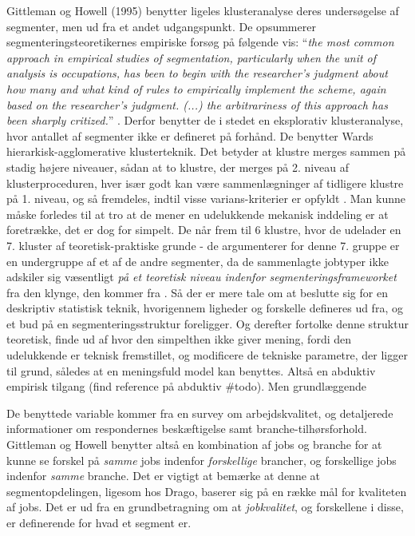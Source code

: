 Gittleman og Howell (1995) benytter ligeles klusteranalyse deres undersøgelse af segmenter, men ud fra et andet udgangspunkt. De opsummerer segmenteringsteoretikernes empiriske forsøg på følgende vis: “\emph{the most common approach in empirical studies of segmentation, particularly when the unit of analysis is occupations, has been to begin with the researcher's judgment about how many and what kind of rules to empirically implement the scheme, again based on the researcher's judgment. (...) the arbitrariness of this approach has been sharply critized.}” \parencite[422]{Gittleman1995}. Derfor benytter de i stedet en eksplorativ klusteranalyse, hvor antallet af segmenter ikke er defineret på forhånd. De benytter Wards hierarkisk-agglomerative klusterteknik. Det betyder at klustre merges sammen på stadig højere niveauer, sådan at to klustre, der merges på 2. niveau af klusterproceduren, hver især godt kan være sammenlægninger af tidligere klustre på 1. niveau, og så fremdeles, indtil visse varians-kriterier er opfyldt \parencite[425]{Gittleman1995}.
Man kunne måske forledes til at tro at de mener en udelukkende mekanisk inddeling er at foretrække, det er dog for simpelt. De når frem til 6 klustre, hvor de udelader en 7. kluster af teoretisk-praktiske grunde - de argumenterer for denne 7. gruppe er en undergruppe af et af de andre segmenter, da de sammenlagte jobtyper ikke adskiler sig væsentligt \emph{på et teoretisk niveau indenfor segmenteringsframeworket} fra den klynge, den kommer fra \parencite[424]{Gittleman1995}. Så der er mere tale om at beslutte sig for en deskriptiv statistisk teknik, hvorigennem ligheder og forskelle defineres ud fra, og et bud på en segmenteringsstruktur foreligger. Og derefter fortolke denne struktur teoretisk, finde ud af hvor den simpelthen ikke giver mening, fordi den udelukkende er teknisk fremstillet, og modificere de tekniske parametre, der ligger til grund, således at en meningsfuld model kan benyttes. Altså en abduktiv empirisk tilgang (find reference på abduktiv \#todo). Men grundlæggende 

De benyttede variable kommer fra en survey om arbejdskvalitet, og detaljerede informationer om respondernes beskæftigelse samt branche-tilhørsforhold. Gittleman og Howell benytter altså en kombination af jobs og branche for at kunne se forskel på \emph{samme} jobs indenfor \emph{forskellige} brancher, og forskellige jobs indenfor \emph{samme} branche. 
Det er vigtigt at bemærke at denne at segmentopdelingen, ligesom hos Drago, baserer sig på en række mål for kvaliteten af jobs. Det er ud fra en grundbetragning om at \emph{jobkvalitet}, og forskellene i disse, er definerende for hvad et segment er. 

